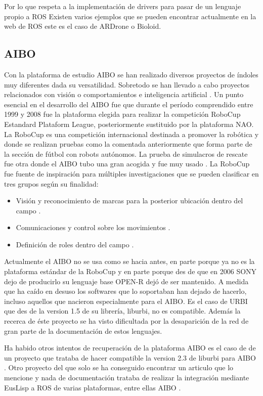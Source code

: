 \documentclass[12pt,a4paper,final,twoside]{book}
\begin{document}
Por lo que respeta a la implementación de drivers para pasar de un lenguaje propio a ROS Existen varios ejemplos que se pueden encontrar actualmente en la web de ROS este es el caso de ARDrone o Bioloid. 

\subsection{AIBO}

Con la plataforma de estudio AIBO se han realizado diversos proyectos de índoles muy diferentes dada su versatilidad. Sobretodo se han llevado a cabo proyectos relacionados con visión \cite{xavi} o comportamientos e inteligencia artificial \cite{riki}.
Un punto esencial en el desarrollo del AIBO fue que durante el período comprendido entre 1999 y 2008 fue la plataforma elegida para realizar la competición RoboCup Estandard Plataform League, posteriormente sustituido por la plataforma NAO. La RoboCup es una competición internacional destinada a promover la robótica y donde se realizan pruebas como la comentada anteriormente que forma parte de la sección de fútbol con robots autónomos. La prueba de simulacros de rescate fue otra donde el AIBO tubo una gran acogida y fue muy usado \cite{robocup}.
La RoboCup fue fuente de inspiración para múltiples investigaciones que se pueden clasificar en tres grupos según su finalidad:
\begin{itemize}
\item Visión y reconocimiento de marcas para la posterior ubicación dentro del campo \cite{morales}.
\item Comunicaciones y control sobre los movimientos \cite{jesus}.
\item Definición de roles dentro del campo \cite{metod}.
\end{itemize}

Actualmente el AIBO no se usa como se hacia antes, en parte porque ya no es la plataforma estándar de la RoboCup y en parte porque des de que en 2006 SONY dejo de producirlo su lenguaje base OPEN-R\cite{OPEN-R PG} dejó de ser mantenido.
A medida que ha caído en desuso los softwares que lo soportaban han dejado de hacerlo, incluso aquellos que nacieron especialmente para el AIBO. Es el caso de URBI que des de la version 1.5 de su librería, liburbi, no es compatible.
Además la recerca de éste proyecto se ha visto dificultada por la desaparición de la red de gran parte de la documentación de estos lenguajes.

Ha habido otros intentos de recuperación de la plataforma AIBO es el caso de de un proyecto que trataba de hacer compatible la version 2.3 de liburbi para AIBO \cite{kecsap}.
Otro proyecto del que solo se ha conseguido encontrar un articulo que lo mencione y nada de documentación  trataba de realizar la integración mediante EusLisp a ROS de varias plataformas, entre ellas AIBO \cite{euslisp}.
\end{document}
